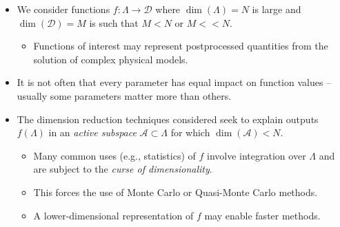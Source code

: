 \documentclass[11pt]{beamer}
\newcommand{\A}{\mathcal{A}}
\begin{document}
\begin{frame}

\begin{itemize}

	\item We consider functions $f: \Lambda \to \mathcal{D}$ where $\dim(\Lambda)=N$ is large and $\dim(\mathcal{D})=M$ is such that $M<N$ or $M<<N$.

\begin{itemize}
		\item Functions of interest may represent postprocessed quantities from the solution of complex physical models.
\end{itemize}

\item It is not often that every parameter has equal impact on function values -- usually some parameters matter more than others.

\item The dimension reduction techniques considered seek to explain outputs $f(\Lambda)$ in an \textit{active subspace} $\mathcal{A} \subset \Lambda$ for which $\dim(\A)<N.$

\begin{itemize}
\item Many common uses (e.g., statistics) of $f$ involve integration over $\Lambda$ and are subject to the \textit{curse of dimensionality}.
\item This forces the use of Monte Carlo or Quasi-Monte Carlo methods.
\item A lower-dimensional representation of $f$ may enable faster methods.
\end{itemize}


\end{itemize}


\end{frame}
\end{document}
